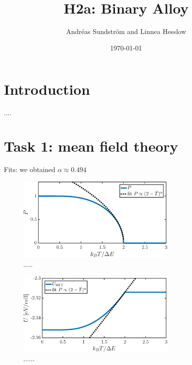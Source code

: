 
\usepackage{units}
\usepackage{physics}

\newcommand{\ee}{\mathrm{e}}
\newcommand{\ii}{\mathrm{i}}

\title{H2a: Binary Alloy}
\author{Andr\'eas Sundstr\"om and Linnea Hesslow}
\date{\today}





\section*{Introduction}

....

\section*{Task 1: mean field theory}
Fits: we obtained $\alpha \approx 0.494$

\begin{figure}[!ht]
\begin{center}
  \includegraphics[width=0.7\textwidth]{../figures/P_MFT} 
  \caption{.....}
  \label{fig:T1:P}
\end{center}
\end{figure}

\begin{figure}[!ht]
\begin{center}
  \includegraphics[width=0.7\textwidth]{../figures/E_MFT} 
  \caption{......}
  \label{fig:T1:E}
\end{center}
\end{figure}

